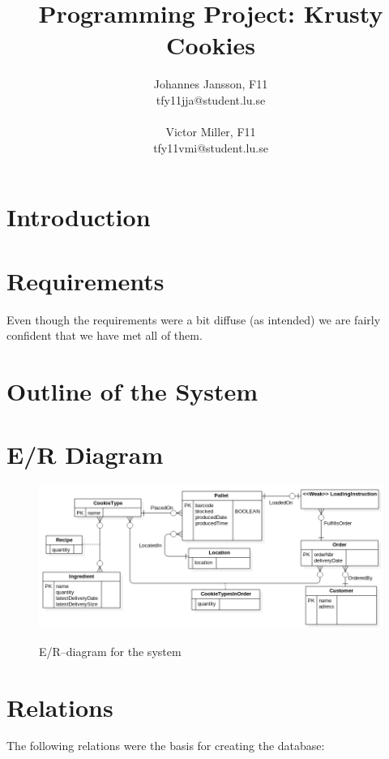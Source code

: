 \documentclass[a4paper]{scrartcl}
\numberwithin{equation}{section}
\begin{document}
\title{Programming Project: Krusty Cookies}
\author{Johannes Jansson, F11\\tfy11jja@student.lu.se\\\\Victor Miller, F11\\tfy11vmi@student.lu.se}

\date{}
\maketitle
\newpage

\section*{Introduction}
\section*{Requirements}
Even though the requirements were a bit diffuse (as intended) we are fairly confident that we have met all of them. 
\section*{Outline of the System}
\section*{E/R Diagram}

\begin{figure}[h!]
  \begin{centering}
    \includegraphics[width=\textwidth]{../ER.png}
    \label{er-diagram}
    \caption{E/R--diagram for the system}
  \end{centering}
\end{figure}

\section*{Relations}
The following relations were the basis for creating the database:
\end{document}
